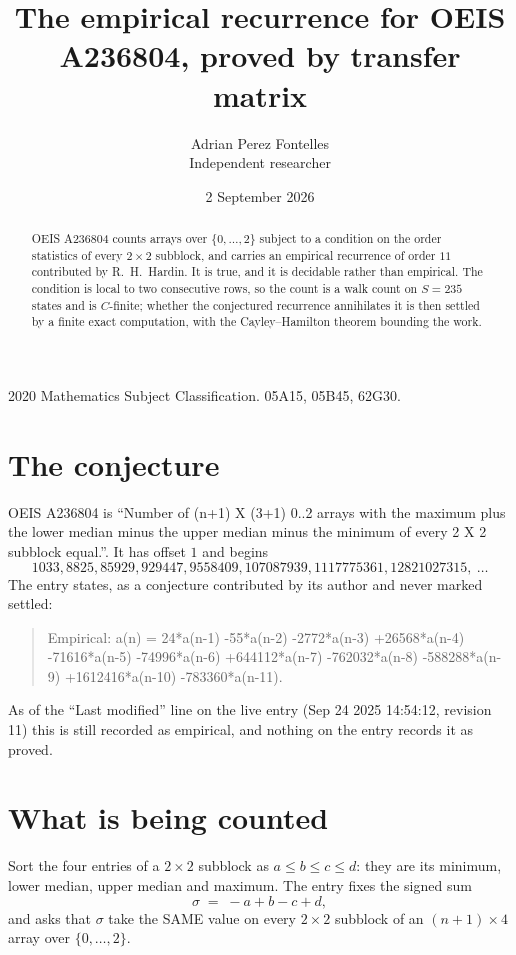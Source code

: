 \documentclass[11pt,a4paper]{article}
\title{The empirical recurrence for OEIS A236804, proved by transfer matrix}
\author{Adrian Perez Fontelles\\ \small Independent researcher}
\date{2 September 2026}
\theoremstyle{plain}
\theoremstyle{definition}
\begin{document}
\maketitle

\begin{abstract}
OEIS A236804 counts arrays over $\{0,\dots,2\}$ subject to a condition on the order
statistics of every $2\times2$ subblock, and carries an empirical recurrence of order
$11$ contributed by R.~H.~Hardin. It is true, and it is decidable rather than empirical.
The condition is local to two consecutive rows, so the count is a walk count on $S=235$
states and is $C$-finite; whether the conjectured recurrence annihilates it is then settled by
a finite exact computation, with the Cayley--Hamilton theorem bounding the work.
\end{abstract}

\noindent\small 2020 Mathematics Subject Classification. 05A15, 05B45, 62G30.\normalsize

\section{The conjecture}

OEIS A236804 is ``Number of (n+1) X (3+1) 0..2 arrays with the maximum plus the lower median minus the upper median minus the minimum of every 2 X 2 subblock equal.''. It has offset $1$ and begins
\[
1033, 8825, 85929, 929447, 9558409, 107087939, 1117775361, 12821027315,\ \dots
\]
The entry states, as a conjecture contributed by its author and never marked settled:
\begin{quote}
Empirical: a(n) = 24*a(n-1) -55*a(n-2) -2772*a(n-3) +26568*a(n-4) -71616*a(n-5) -74996*a(n-6) +644112*a(n-7) -762032*a(n-8) -588288*a(n-9) +1612416*a(n-10) -783360*a(n-11).
\end{quote}
As of the ``Last modified'' line on the live entry (Sep 24 2025 14:54:12, revision 11) this is still
recorded as empirical, and nothing on the entry records it as proved.

\section{What is being counted}

Sort the four entries of a $2\times2$ subblock as $a\le b\le c\le d$: they
are its minimum, lower median, upper median and maximum. The entry fixes the signed sum
\[
\sigma\;=\;-a+b-c+d,
\]
and asks that $\sigma$ take the SAME value on every $2\times2$ subblock of an
$(n+1)\times4$ array over $\{0,\dots,2\}$.
\end{document}
